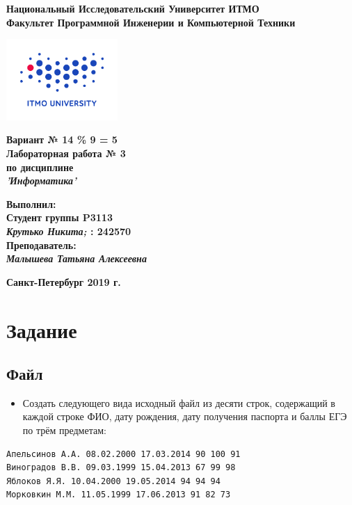\documentclass[11pt]{article}
\author{Krutko Nikita / KrutNA}
\date{\today}
\title{}
\begin{document}
\large
\thispagestyle{empty}
\begin{center}
\textbf{Национальный Исследовательский Университет ИТМО}\\
\textbf{Факультет Программной Инженерии и Компьютерной Техники}\\
\end{center}
\vspace{2em}
\begin{center}
\includegraphics[width=120pt]{../itmo-logo.png}
\end{center}
\LARGE
\vspace{5em}
\begin{center}
\textbf{Вариант № 14 \% 9 = 5}\\
\textbf{Лабораторная работа № 3}\\
\Large
\textbf{по дисциплине}\\
\LARGE
\textbf{\emph{'Информатика'}}\\
\end{center}
\vspace{11em}
\large
\begin{flushright}
\textbf{Выполнил:}\\
\textbf{Студент группы P3113}\\
\textbf{\emph{Крутько Никита;} : 242570}\\
\textbf{Преподаватель:}\\
\textbf{\emph{Малышева Татьяна Алексеевна}}\\
\end{flushright}
\vspace{4em}
\large
\begin{center}
\textbf{Санкт-Петербург 2019 г.}
\end{center}
\pagebreak{}
\setcounter{tocdepth}{2}
\tableofcontents
\normalsize
\section{Задание}
\label{sec:orgf09ad0d}
\subsection{Файл}
\label{sec:org559666b}
\begin{itemize}
\item Создать следующего вида исходный файл из десяти строк, содержащий в каждой строке ФИО, дату рождения, дату получения паспорта и баллы ЕГЭ по трём предметам:
\end{itemize}
\scriptsize
\begin{verbatim}
Апельсинов А.А. 08.02.2000 17.03.2014 90 100 91
Виноградов В.В. 09.03.1999 15.04.2013 67 99 98
Яблоков Я.Я. 10.04.2000 19.05.2014 94 94 94
Морковкин М.М. 11.05.1999 17.06.2013 91 82 73
\end{verbatim}
\end{document}
